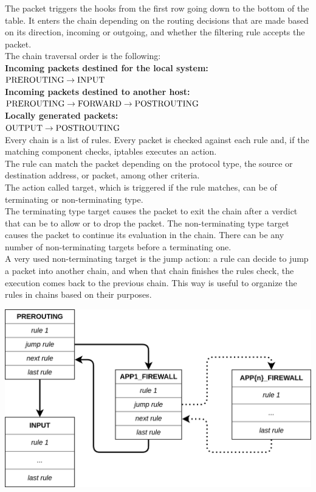 \documentclass[12pt]{article}
\begin{document}
	\bigbreak

	The packet triggers the hooks from the first row going down to the bottom of the table. It enters the chain depending on the routing decisions that are made based on its direction, incoming or outgoing, and whether the filtering rule accepts the packet.\\
	\bigbreak
	The chain traversal order is the following:\\	
	\textbf{Incoming packets destined for the local system:}\\
	$\hbox{PREROUTING} \rightarrow \hbox{INPUT}$\\
	\medskip
	\textbf{Incoming packets destined to another host:}\\
	$\hbox{PREROUTING} \rightarrow \hbox{FORWARD} \rightarrow \hbox{POSTROUTING}$\\
	\medskip
	\textbf{Locally generated packets:}\\
	$\hbox{OUTPUT} \rightarrow \hbox{POSTROUTING}$\\

	\bigbreak
	Every chain is a list of rules. Every packet is checked against each rule and, if the matching component checks, iptables executes an action.\\
	The rule can match the packet depending on the protocol type, the source or destination address, or packet, among other criteria.\\
	The action called target, which is triggered if the rule matches, can be of terminating or non-terminating type.\\
	The terminating type target causes the packet to exit the chain after a verdict that can be to allow or to drop the packet. The non-terminating type target causes the packet to continue its evaluation in the chain. There can be any number of non-terminating targets before a terminating one.\\
	A very used non-terminating target is the jump action: a rule can decide to jump a packet into another chain, and when that chain finishes the rules check, the execution comes back to the previous chain. This way is useful to organize the rules in chains based on their purposes.\\
	\bigbreak

	\begin{center}
		\includegraphics[width=\linewidth]{images/iptables_jump_chains.png}
	\end{center}
	\bigbreak
\end{document}
